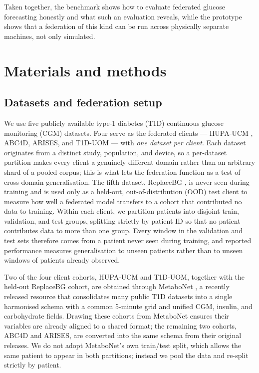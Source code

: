 \documentclass[10pt,letterpaper]{article}
\begin{document}
Taken together, the benchmark shows how to evaluate federated glucose
forecasting honestly and what such an evaluation reveals, while the prototype
shows that a federation of this kind can be run across physically separate
machines, not only simulated.

\section*{Materials and methods}

\subsection*{Datasets and federation setup}

We use five publicly available type-1 diabetes (T1D) continuous glucose
monitoring (CGM) datasets. Four serve as the federated clients --- HUPA-UCM
\cite{hidalgo2024hupaucm}, ABC4D, ARISES, and T1D-UOM
\cite{alsuhaymi2025t1duom} --- with \emph{one dataset per client}. Each dataset
originates from a distinct study, population, and device, so a per-dataset
partition makes every client a genuinely different domain rather than an
arbitrary shard of a pooled corpus; this is what lets the federation function as
a test of cross-domain generalisation. The fifth dataset, ReplaceBG
\cite{aleppo2017replacebg}, is never seen during training and is used only as a
held-out, out-of-distribution (OOD) test client to measure how well a federated model transfers to a cohort that
contributed no data to training. Within each client, we partition patients
into disjoint train, validation, and test groups, splitting strictly by
patient ID so that no patient contributes data to more than one group. Every
window in the validation and test sets therefore comes from a patient never
seen during training, and reported performance measures generalisation to
unseen patients rather than to unseen windows of patients already observed.

Two of the four client cohorts, HUPA-UCM and T1D-UOM, together with the held-out
ReplaceBG cohort, are obtained through MetaboNet
\cite{wolff2026metabonet}, a recently released resource that consolidates many
public T1D datasets into a single harmonised schema with a common 5-minute grid
and unified CGM, insulin, and carbohydrate fields. Drawing these cohorts from
MetaboNet ensures their variables are already aligned to a shared format; the
remaining two cohorts, ABC4D and ARISES, are converted into the same schema
from their original releases. We do not adopt MetaboNet's own train/test split,
which allows the same patient to appear in both partitions; instead we pool the
data and re-split strictly by patient.
\end{document}
